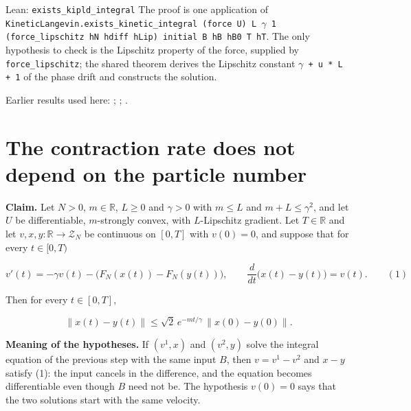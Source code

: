 \documentclass[11pt,a4paper]{article}
\begin{document}
\begin{leanbox}{Lean: \texttt{exists\_\allowbreak{}kipld\_\allowbreak{}integral}}
The proof is one application of \texttt{Kinetic\allowbreak{}Langevin.\allowbreak{}exists\_\allowbreak{}kinetic\_\allowbreak{}integral (force U) L \ensuremath{\gamma} 1 (force\_\allowbreak{}lipschitz h\allowbreak{}N hdiff h\allowbreak{}Lip) initial B h\allowbreak{}B h\allowbreak{}B0 T h\allowbreak{}T}. The only hypothesis to check is the Lipschitz property of the force, supplied by \texttt{force\_\allowbreak{}lipschitz}; the shared theorem derives the Lipschitz constant \texttt{\ensuremath{\gamma} + u * L + 1} of the phase drift and constructs the solution.
\end{leanbox}


Earlier results used here: \cite[Section~3.1.1]{LangevinLean2026IPLA}; \cite[Section~3.1.1]{LangevinLean2026Kinetic}; \cite[Section~3.1.3]{LangevinLean2026Kinetic}.

\section{\texorpdfstring{The contraction rate does not depend on the particle number}{The contraction rate does not depend on the particle number}}


\textbf{Claim.} Let \(N>0\), \(m\in\mathbb R\), \(L\ge0\) and \(\gamma>0\) with \(m\le L\) and \(m+L\le\gamma^2\), and let \(U\) be differentiable, \(m\)-strongly convex, with \(L\)-Lipschitz gradient. Let \(T\in\mathbb R\) and let \(v,x,y:\mathbb R\to\mathcal Z_N\) be continuous on \([0,T]\) with \(v(0)=0\), and suppose that for every \(t\in[0,T)\)


\[v'(t)=-\gamma v(t)-\bigl(F_N(x(t))-F_N(y(t))\bigr),\qquad\frac{d}{dt}\bigl(x(t)-y(t)\bigr)=v(t).\qquad(1)\]


Then for every \(t\in[0,T]\),


\[\|x(t)-y(t)\|\le\sqrt2\,e^{-mt/\gamma}\,\|x(0)-y(0)\|.\]


\textbf{Meaning of the hypotheses.} If \((v^1,x)\) and \((v^2,y)\) solve the integral equation of the previous step with the same input \(B\), then \(v=v^1-v^2\) and \(x-y\) satisfy (1): the input cancels in the difference, and the equation becomes differentiable even though \(B\) need not be. The hypothesis \(v(0)=0\) says that the two solutions start with the same velocity.
\end{document}
